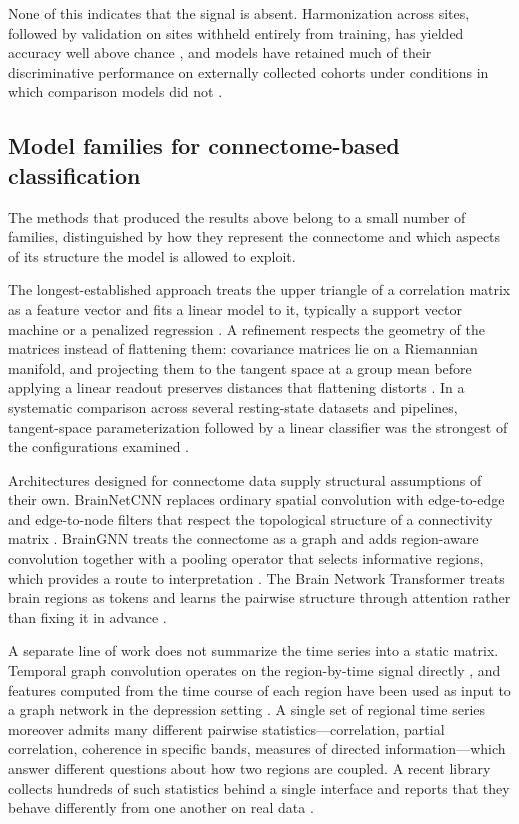 None of this indicates that the signal is absent. Harmonization across sites, followed by
validation on sites withheld entirely from training, has yielded accuracy well above chance
\citep{yamashita2020}, and models have retained much of their discriminative performance on
externally collected cohorts under conditions in which comparison models did not
\citep{liu2024lgmf}.

\subsection{Model families for connectome-based classification}
\label{sec:related:models}

The methods that produced the results above belong to a small number of families, distinguished by
how they represent the connectome and which aspects of its structure the model is allowed to
exploit.

The longest-established approach treats the upper triangle of a correlation matrix as a feature
vector and fits a linear model to it, typically a support vector machine or a penalized regression
\citep{zeng2012}. A refinement respects the geometry of the matrices instead of flattening them:
covariance matrices lie on a Riemannian manifold, and projecting them to the tangent space at a
group mean before applying a linear readout preserves distances that flattening distorts
\citep{varoquaux2010, barachant2013}. In a systematic comparison across several resting-state
datasets and pipelines, tangent-space parameterization followed by a linear classifier was the
strongest of the configurations examined \citep{dadi2019}.

Architectures designed for connectome data supply structural assumptions of their own. BrainNetCNN
replaces ordinary spatial convolution with edge-to-edge and edge-to-node filters that respect the
topological structure of a connectivity matrix \citep{kawahara2017}. BrainGNN treats the connectome
as a graph and adds region-aware convolution together with a pooling operator that selects
informative regions, which provides a route to interpretation \citep{li2021braingnn}. The Brain
Network Transformer treats brain regions as tokens and learns the pairwise structure through
attention rather than fixing it in advance \citep{kan2022bnt}.

A separate line of work does not summarize the time series into a static matrix. Temporal graph
convolution operates on the region-by-time signal directly \citep{gadgil2020stgcn}, and features
computed from the time course of each region have been used as input to a graph network in the
depression setting \citep{dai2023jad}. A single set of regional time series moreover admits many
different pairwise statistics---correlation, partial correlation, coherence in specific bands,
measures of directed information---which answer different questions about how two regions are
coupled. A recent library collects hundreds of such statistics behind a single interface and reports
that they behave differently from one another on real data \citep{cliff2023pyspi}.

